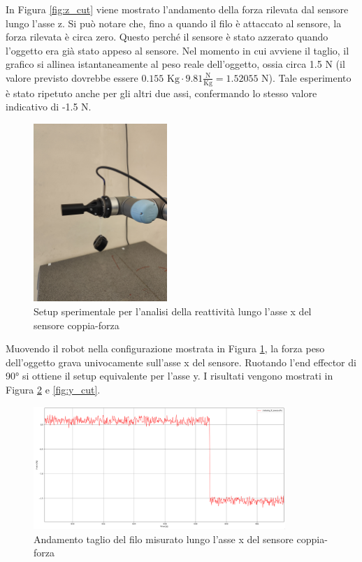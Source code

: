 In Figura \ref{fig:z_cut} viene mostrato l'andamento della forza rilevata dal sensore lungo l'asse z. 
Si pu\`{o} notare che, fino a quando il filo \`{e} attaccato al sensore, la forza rilevata \`{e} circa zero. 
Questo perch\'{e} il sensore \`{e} stato azzerato quando l'oggetto era gi\`{a} stato appeso al sensore. 
Nel momento in cui avviene il taglio, il grafico si allinea istantaneamente al peso reale dell'oggetto, 
ossia circa 1.5 N (il valore previsto dovrebbe essere $0.155 \text{ Kg} \cdot 9.81 \frac{\text{N}}{\text{Kg}} = 1.52055 \text{ N}$).
Tale esperimento \`{e} stato ripetuto anche per gli altri due assi, confermando lo stesso valore indicativo di -1.5 N.
\begin{figure}[H]
    \centering
    \includegraphics*[width=0.45\textwidth]{images/setup_x.jpg}
    \caption{Setup sperimentale per l'analisi della reattivit\`{a} lungo l'asse x del sensore coppia-forza}
    \label{fig:setup_x}
\end{figure}
Muovendo il robot nella configurazione mostrata in Figura \ref{fig:setup_x}, la forza peso dell'oggetto grava univocamente sull'asse x 
del sensore. 
Ruotando l'end effector di 90° si ottiene il setup equivalente per l'asse y.
I risultati vengono mostrati in Figura \ref{fig:x_cut} e \ref{fig:y_cut}.
\newpage 
\begin{figure}[H]
    \centering
    \includegraphics*[width=0.85\textwidth]{images/x_cut.png}
    \caption{Andamento taglio del filo misurato lungo l'asse x del sensore coppia-forza}
    \label{fig:x_cut}
\end{figure}
